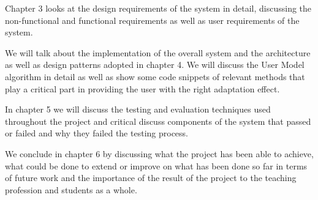 Chapter 3 looks at the design requirements of the system in detail, discussing the non-functional and functional requirements as well as user requirements of the system.

We will talk about the implementation of the overall system and the architecture as well as design patterns adopted in chapter 4. We will discuss the User Model algorithm in detail as well as show some code snippets of relevant methods that play a critical part in providing the user with the right adaptation effect.

In chapter 5 we will discuss the testing and evaluation techniques used throughout the project and critical discuss components of the system that passed or failed and why they failed the testing process.

We conclude in chapter 6 by discussing what the project has been able to achieve, what could be done to extend or improve on what has been done so far in terms of future work and the importance of the result of the project to the teaching profession and students as a whole.

